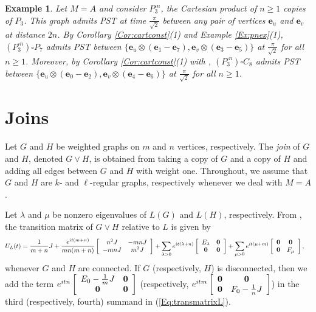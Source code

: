 \documentclass[11pt]{article}
\newtheorem{example}[theorem]{Example}
\newcommand{\zero}{{\bf{0}}}
\newcommand{\be}{\mathbf e}
\begin{document}
\begin{example}
Let $M=A$ and consider $P_3^{\square n}$, the Cartesian product of $n\geq 1$ copies of $P_3$. This graph admits PST at time $\frac{\pi}{\sqrt{2}}$ between any pair of vertices $\be_u$ and $\be_{v}$ at distance $2n$. By Corollary \ref{Cor:cartconst}(1) and Example \ref{Ex:pnex}(1), $(P_3^{\square n})\square P_7$ admits PST between $\{\be_u\otimes(\be_1-\be_7),\be_v\otimes(\be_3-\be_5)\}$ at $\frac{\pi}{\sqrt{2}}$ for all $n\geq 1$. Moreover, by Corollary \ref{Cor:cartconst}(1) with \cite[Theorem 6.5(vii)]{kim2024generalization}, $(P_3^{\square n})\square C_8$ admits PST between $\{\be_u\otimes(\be_0-\be_2),\be_v\otimes(\be_4-\be_6)\}$ at $\frac{\pi}{\sqrt{2}}$ for all $n\geq 1$.
\end{example}

\section{Joins}\label{Sec:joins}

Let $G$ and $H$ be weighted graphs on $m$ and $n$ vertices, respectively. The \textit{join} of $G$ and $H$, denoted $G\vee H$, is obtained from taking a copy of $G$ and a copy of $H$ and adding all edges between $G$ and $H$ with weight one. Throughout, we assume that $G$ and $H$ are $k$- and $\ell$-regular graphs, respectively whenever we deal with $M=A$.

Let $\lambda$ and $\mu$ be nonzero eigenvalues of $L(G)$ and $L(H)$, respectively. From \cite[Equation 33]{Alvir2016}, the transition matrix of $G\vee H$ relative to $L$ is given by
\begin{equation}
\label{Eq:transmatrixL}
\begin{split}
U_{L}(t)&=\frac{1}{m+n}J+\frac{e^{it(m+n)}}{mn(m+n)}\left[ \begin{array}{ccccc} n^2J&-mnJ \\ -mnJ&m^2J\end{array} \right]+\sum_{\lambda>0}e^{it(\lambda+n)}\left[\begin{array}{cc} E_{\lambda}&\zero \\ \zero&\zero\end{array} \right]+\sum_{\mu>0}e^{it(\mu+m)}\left[\begin{array}{cc} \zero&\zero \\ \zero&F_{\mu}\end{array} \right], 
\end{split}
\end{equation}
whenever $G$ and $H$ are connected. If $G$ (respectively, $H$) is disconnected, then we add the term $e^{itn}\left[\begin{array}{cc} E_{0}-\frac{1}{m}J&\zero \\ \zero&\zero\end{array}\right]$ (respectively, $e^{itm}\left[\begin{array}{cc} \zero&\zero \\ \zero&F_{0}-\frac{1}{n}J\end{array} \right]$) in the third (respectively, fourth) summand in (\ref{Eq:transmatrixL}).
\end{document}
